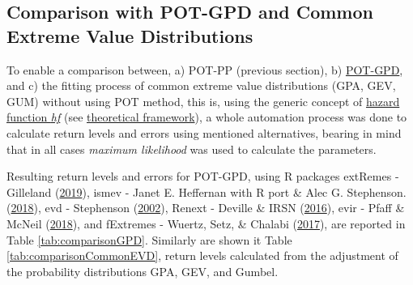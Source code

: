 \documentclass[12pt,oneside]{reedthesis}
\begin{document}
\hypertarget{comparison-with-pot-gpd-and-common-extreme-value-distributions}{%
\subsection{Comparison with POT-GPD and Common Extreme Value Distributions}\label{comparison-with-pot-gpd-and-common-extreme-value-distributions}}

To enable a comparison between, a) POT-PP (previous section), b) \protect\hyperlink{pot-gpd}{POT-GPD}, and c) the fitting process of common extreme value distributions (GPA, GEV, GUM) without using POT method, this is, using the generic concept of \protect\hyperlink{hf}{hazard function \emph{hf}} (see \protect\hyperlink{rmd-thefra}{theoretical framework}), a whole automation process was done to calculate return levels and errors using mentioned alternatives, bearing in mind that in all cases \emph{maximum likelihood} was used to calculate the parameters.

Resulting return levels and errors for POT-GPD, using R packages extRemes - Gilleland (\protect\hyperlink{ref-Gilleland2019}{2019}), ismev - Janet E. Heffernan with R port \& Alec G. Stephenson. (\protect\hyperlink{ref-JanetE.HeffernanwithRport2018}{2018}), evd - Stephenson (\protect\hyperlink{ref-Stephenson2002}{2002}), Renext - Deville \& IRSN (\protect\hyperlink{ref-Deville2016}{2016}), evir - Pfaff \& McNeil (\protect\hyperlink{ref-Pfaff2018}{2018}), and fExtremes - Wuertz, Setz, \& Chalabi (\protect\hyperlink{ref-Wuertz2017}{2017}), are reported in Table \ref{tab:comparisonGPD}. Similarly are shown it Table \ref{tab:comparisonCommonEVD}, return levels calculated from the adjustment of the probability distributions GPA, GEV, and Gumbel.
\end{document}
